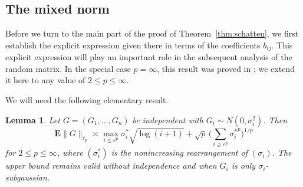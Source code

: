 \documentclass[10pt,reqno]{amsart}
\newtheorem{lem}[thm]{Lemma}
\theoremstyle{definition}
\numberwithin{equation}{section}
\numberwithin{figure}{section}
\numberwithin{table}{section}
\begin{document}
\subsection{The mixed norm}

Before we turn to the main part of the proof of 
Theorem~\ref{thm:schatten}, we first establish the explicit expression 
given there in terms of the coefficients $b_{ij}$. This explicit 
expression will play an important role in the subsequent analysis of the 
random matrix. In the special case $p=\infty$, this result was proved in 
\cite[Theorem~1.2]{vH17}; we extend it here to any value of $2\le p\le 
\infty$.

We will need the following elementary result.

\begin{lem}
\label{lem:gausslp}
Let $G=(G_1,\ldots,G_n)$ be independent with $G_i\sim N(0,\sigma_i^2)$.
Then
$$
	\mathbf{E}\|G\|_{\ell_p} \asymp
	\max_{i\le e^p}\sigma_i^*\sqrt{\log(i+1)} +
	\sqrt{p}\,\Bigg(\sum_{i\ge e^p} {\sigma_i^*}^p\Bigg)^{1/p}
$$
for $2\le p\le \infty$, where $(\sigma_i^*)$ is the nonincreasing 
rearrangement of $(\sigma_i)$. The upper bound remains valid without 
independence and when $G_i$ is only $\sigma_i$-subgaussian.
\end{lem}
\end{document}
